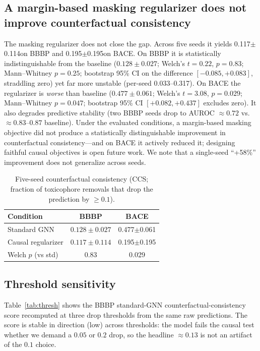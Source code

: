 \documentclass[a4paper,fleqn]{cas-dc}
\newcommand{\Fcausalreg}{0.117}
\newcommand{\Fcausalregsd}{0.114} %
\newcommand{\BACEcausalstd}{0.477}
\newcommand{\BACEcausalstdsd}{0.061} %
\newcommand{\BACEcausalreg}{0.195}
\newcommand{\BACEcausalregsd}{0.195} %
\begin{document}
\subsection{A margin-based masking regularizer does not improve counterfactual consistency}
\label{sec:reg}
The masking regularizer does not close the gap. Across five seeds it yields \Fcausalreg$\pm$\Fcausalregsd on BBBP and \BACEcausalreg$\pm$\BACEcausalregsd on BACE. On BBBP it is statistically indistinguishable from the baseline ($0.128\pm0.027$; Welch's $t=0.22$, $p=0.83$; Mann--Whitney $p=0.25$; bootstrap 95\% CI on the difference $[-0.085, +0.083]$, straddling zero) yet far more unstable (per-seed 0.033--0.317). On BACE the regularizer is \emph{worse} than baseline ($0.477\pm0.061$; Welch's $t=3.08$, $p=0.029$; Mann--Whitney $p=0.047$; bootstrap 95\% CI $[+0.082, +0.437]$ excludes zero). It also degrades predictive stability (two BBBP seeds drop to AUROC $\approx 0.72$ vs.~$\approx 0.83$--$0.87$ baseline). Under the evaluated conditions, a margin-based masking objective did not produce a statistically distinguishable improvement in counterfactual consistency---and on BACE it actively reduced it; designing faithful causal objectives is open future work. We note that a single-seed ``+58\%'' improvement does not generalize across seeds.

\begin{table}[t]
\centering
\caption{Five-seed counterfactual consistency (CCS; fraction of toxicophore removals that drop the prediction by $\geq 0.1$).}
\label{tab:faith}
\begin{tabular}{@{}l c c@{}}
\toprule
Condition & BBBP & BACE \\
\midrule
Standard GNN & $0.128\pm0.027$ & \BACEcausalstd$\pm$\BACEcausalstdsd \\
Causal regularizer & $0.117\pm0.114$ & \BACEcausalreg$\pm$\BACEcausalregsd \\
\midrule
Welch $p$ (vs std) & 0.83 & 0.029 \\
\bottomrule
\end{tabular}
\end{table}

\subsection{Threshold sensitivity}
Table~\ref{tab:thresh} shows the BBBP standard-GNN counterfactual-consistency score recomputed at three drop thresholds from the same raw predictions. The score is stable in direction (low) across thresholds: the model fails the causal test whether we demand a $0.05$ or $0.2$ drop, so the headline $\approx 0.13$ is not an artifact of the $0.1$ choice.
\end{document}
